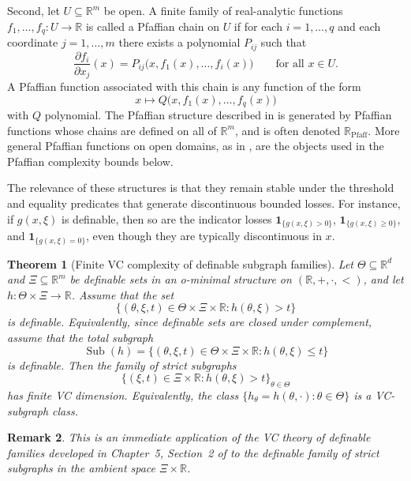 \documentclass[11pt]{article}
\newtheorem{theorem}{Theorem}[section]
\newtheorem{remark}[theorem]{Remark}
\begin{document}
Second, let $U\subseteq\mathbb{R}^{m}$ be open. A finite family of
real-analytic functions $f_{1},\dots,f_{q}:U\to\mathbb{R}$ is called a Pfaffian
chain on $U$ if for each $i=1,\dots,q$ and each coordinate $j=1,\dots,m$
there exists a polynomial $P_{ij}$ such that 
\[
\frac{\partial f_{i}}{\partial x_{j}}(x)=P_{ij}\bigl(x,f_{1}(x),\dots,f_{i}(x)\bigr)\qquad\text{for all }x\in U.
\]
A Pfaffian function associated with this chain is any function of
the form 
\[
x\longmapsto Q\bigl(x,f_{1}(x),\dots,f_{q}(x)\bigr)
\]
with $Q$ polynomial. The Pfaffian structure described in
\citet[Example~1.8]{LeLoi2010} is generated by Pfaffian functions whose
chains are defined on all of $\mathbb{R}^{m}$, and is often denoted
$\mathbb{R}_{\mathrm{Pfaff}}$. More
general Pfaffian functions on open domains, as in
\citet[Section~3]{MontanaPardo2009}, are the objects used in the
Pfaffian complexity bounds below.

The relevance of these structures is that they remain stable under
the threshold and equality predicates that generate discontinuous
bounded losses. For instance, if $g(x,\xi)$ is definable, then so
are the indicator losses $\mathbf{1}_{\{g(x,\xi)>0\}}$, $\mathbf{1}_{\{g(x,\xi)\ge0\}}$,
and $\mathbf{1}_{\{g(x,\xi)=0\}}$, even though they are typically
discontinuous in $x$.

\begin{theorem}[Finite VC complexity of definable subgraph families]\label{thm:def-vc}
Let $\Theta\subseteq\mathbb{R}^{d}$ and $\Xi\subseteq\mathbb{R}^{m}$
be definable sets in an o-minimal structure on $(\mathbb{R},+,\cdot,<)$,
and let $h:\Theta\times\Xi\to\mathbb{R}$. Assume that the set 
\[
\{(\theta,\xi,t)\in\Theta\times\Xi\times\mathbb{R}:h(\theta,\xi)>t\}
\]
is definable. Equivalently, since definable sets are closed under
complement, assume that the total subgraph 
\[
\operatorname{Sub}(h)=\{(\theta,\xi,t)\in\Theta\times\Xi\times\mathbb{R}:h(\theta,\xi)\le t\}
\]
is definable. Then the family of strict subgraphs 
\[
\bigl\{(\xi,t)\in\Xi\times\mathbb{R}:h(\theta,\xi)>t\bigr\}_{\theta\in\Theta}
\]
has finite VC dimension. Equivalently, the class $\{h_{\theta}=h(\theta,\cdot):\theta\in\Theta\}$
is a VC-subgraph class. \end{theorem}

\begin{remark} This is an immediate application of the VC theory
of definable families developed in Chapter~5, Section~2 of \citet{vdDries1998}
to the definable family of strict subgraphs in the ambient space $\Xi\times\mathbb{R}$.
\end{remark}
\end{document}
